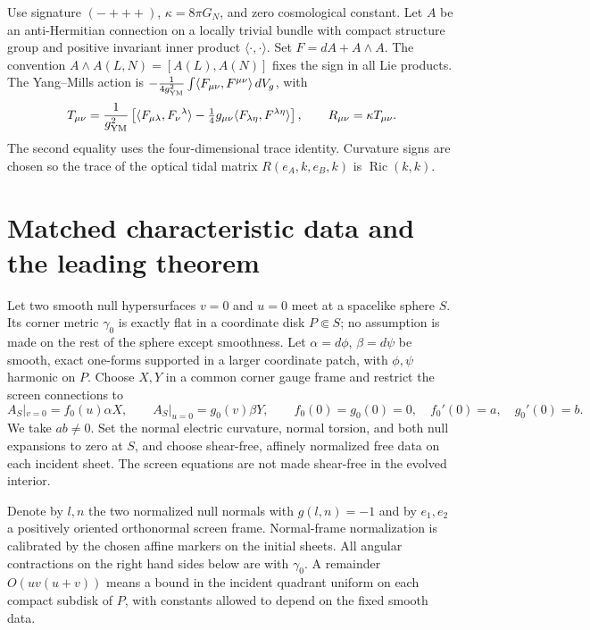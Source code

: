 \documentclass[11pt]{article}
\newcommand{\Ric}{\operatorname{Ric}}
\begin{document}
Use signature \((-+++)\), \(\kappa=8\pi G_N\), and zero cosmological constant. Let \(A\) be an anti-Hermitian connection on a locally trivial bundle with compact structure group and positive invariant inner product \(\langle\cdot,\cdot\rangle\). Set \(F=dA+A\wedge A\). The convention \(A\wedge A(L,N)=[A(L),A(N)]\) fixes the sign in all Lie products. The Yang--Mills action is \(-\frac{1}{4g_{\rm YM}^2}\int\langle F_{\mu\nu},F^{\mu\nu}\rangle\,dV_g\), with
\begin{equation}
 T_{\mu\nu}=\frac{1}{g_{\rm YM}^2}\left[
    \langle F_{\mu\lambda},F_\nu{}^\lambda\rangle
    -\tfrac14 g_{\mu\nu}\langle F_{\lambda\eta},F^{\lambda\eta}\rangle
 \right],
 \qquad R_{\mu\nu}=\kappa T_{\mu\nu}.
 \label{eq:stress}
\end{equation}
The second equality uses the four-dimensional trace identity. Curvature signs are chosen so the trace of the optical tidal matrix \(R(e_A,k,e_B,k)\) is \(\Ric(k,k)\).

\section{Matched characteristic data and the leading theorem}

Let two smooth null hypersurfaces \(v=0\) and \(u=0\) meet at a spacelike sphere \(S\). Its corner metric \(\gamma_0\) is exactly flat in a coordinate disk \(P\Subset S\); no assumption is made on the rest of the sphere except smoothness. Let
\(\alpha=d\phi\), \(\beta=d\psi\) be smooth, exact one-forms supported in a larger coordinate patch, with \(\phi,\psi\) harmonic on \(P\). Choose \(X,Y\) in a common corner gauge frame and restrict the screen connections to
\begin{equation}
 A_S|_{v=0}=f_0(u)\alpha X,\qquad
 A_S|_{u=0}=g_0(v)\beta Y,\qquad
 f_0(0)=g_0(0)=0,\quad f_0'(0)=a,\quad g_0'(0)=b .
 \label{eq:data}
\end{equation}
We take \(ab\ne0\). Set the normal electric curvature, normal torsion, and both null expansions to zero at \(S\), and choose shear-free, affinely normalized free data on each incident sheet. The screen equations are not made shear-free in the evolved interior.

Denote by \(l,n\) the two normalized null normals with \(g(l,n)=-1\) and by \(e_1,e_2\) a positively oriented orthonormal screen frame. Normal-frame normalization is calibrated by the chosen affine markers on the initial sheets. All angular contractions on the right hand sides below are with \(\gamma_0\). A remainder \(O(uv(u+v))\) means a bound in the incident quadrant uniform on each compact subdisk of \(P\), with constants allowed to depend on the fixed smooth data.
\end{document}
